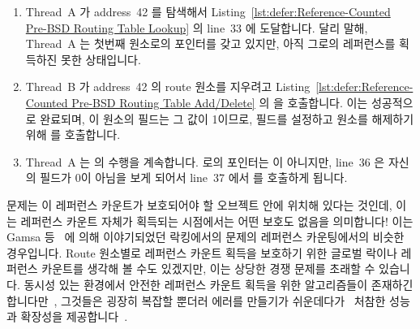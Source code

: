 \begin{enumerate}
\item	Thread~A 가 address~42 를 탐색해서
	Listing~\ref{lst:defer:Reference-Counted Pre-BSD Routing Table Lookup}
	 의 line~33 에 도달합니다.
	달리 말해, Thread~A 는 첫번째 원소로의 포인터를 갖고 있지만, 아직
	그로의 레퍼런스를 획득하진 못한 상태입니다.
\item	Thread~B 가 address~42 의 route 원소를 지우려고
	Listing~\ref{lst:defer:Reference-Counted Pre-BSD Routing Table Add/Delete}
	의  을 호출합니다.
	이는 성공적으로 완료되며, 이 원소의  필드는 그 값이
	1이므로,  필드를 설정하고 원소를 해제하기 위해
	 를 호출합니다.
\item	Thread~A 는  의 수행을 계속합니다.
	 로의 포인터는  이 아니지만, line~36 은 자신의
	 필드가 0이 아님을 보게 되어서 line~37 에서 
	를 호출하게 됩니다.

\end{enumerate}

문제는 이 레퍼런스 카운트가 보호되어야 할 오브젝트 안에 위치해 있다는 것인데,
이는 레퍼런스 카운트 자체가 획득되는 시점에서는 어떤 보호도 없음을 의미합니다!
이는 Gamsa 등~\cite{Gamsa99} 에 의해 이야기되었던 락킹에서의 문제의 레퍼런스
카운팅에서의 비슷한 경우입니다.
Route 원소별로 레퍼런스 카운트 획득을 보호하기 위한 글로벌 락이나 레퍼런스
카운트를 생각해 볼 수도 있겠지만, 이는 상당한 경쟁 문제를 초래할 수 있습니다.
동시성 있는 환경에서 안전한 레퍼런스 카운트 획득을 위한 알고리즘들이 존재하긴
합니다만~\cite{Valois95a}, 그것들은 굉장히 복잡할 뿐더러 에러를 만들기가
쉬운데다가~\cite{MagedMichael95a} 처참한 성능과 확장성을
제공합니다~\cite{ThomasEHart2007a}.

